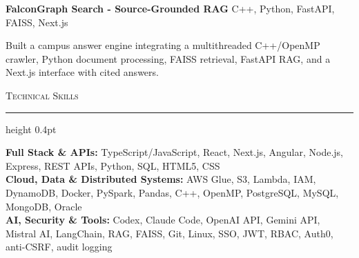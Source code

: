 \documentclass[letterpaper,11pt]{article}
\newcommand{\resumesection}[1]{%
  \par\vspace{2pt}%
  {\large\scshape #1}\par\vspace{2pt}%
  \hrule height 0.4pt\vspace{2pt}%
}
\newcommand{\projectHeading}[2]{
  \textbf{#1} \hfill #2
}
\begin{document}
\projectHeading{FalconGraph Search - Source-Grounded RAG}{C++, Python, FastAPI, FAISS, Next.js}
\begin{tightitemize}
  \item Built a campus answer engine integrating a multithreaded C++/OpenMP crawler, Python document processing, FAISS retrieval, FastAPI RAG, and a Next.js interface with cited answers.
\end{tightitemize}

\resumesection{Technical Skills}
\textbf{Full Stack \& APIs:} TypeScript/JavaScript, React, Next.js, Angular, Node.js, Express, REST APIs, Python, SQL, HTML5, CSS\\
\textbf{Cloud, Data \& Distributed Systems:} AWS Glue, S3, Lambda, IAM, DynamoDB, Docker, PySpark, Pandas, C++, OpenMP, PostgreSQL, MySQL, MongoDB, Oracle\\
\textbf{AI, Security \& Tools:} Codex, Claude Code, OpenAI API, Gemini API, Mistral AI, LangChain, RAG, FAISS, Git, Linux, SSO, JWT, RBAC, Auth0, anti-CSRF, audit logging
\end{document}
